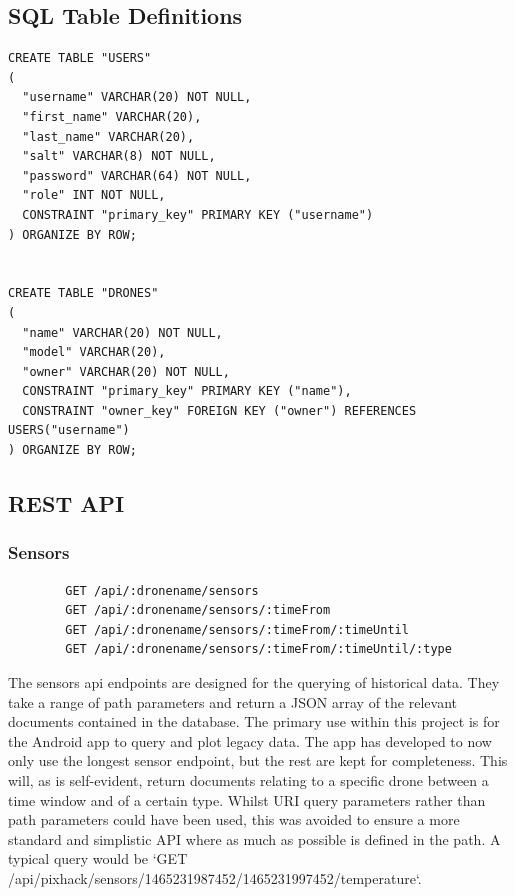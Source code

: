 \documentclass{article}
\begin{document}
\subsection{SQL Table Definitions} \label{SQLDefinitions}
\begin{center}
\begin{lstlisting} 
CREATE TABLE "USERS"
(
  "username" VARCHAR(20) NOT NULL,
  "first_name" VARCHAR(20),
  "last_name" VARCHAR(20),
  "salt" VARCHAR(8) NOT NULL,
  "password" VARCHAR(64) NOT NULL,
  "role" INT NOT NULL,
  CONSTRAINT "primary_key" PRIMARY KEY ("username")
) ORGANIZE BY ROW;


CREATE TABLE "DRONES"
(
  "name" VARCHAR(20) NOT NULL,
  "model" VARCHAR(20),
  "owner" VARCHAR(20) NOT NULL,
  CONSTRAINT "primary_key" PRIMARY KEY ("name"),
  CONSTRAINT "owner_key" FOREIGN KEY ("owner") REFERENCES USERS("username")
) ORGANIZE BY ROW;
\end{lstlisting}
\end{center}

\subsection{REST API} \label{apdxRestApi}
\subsubsection{Sensors}
\begin{center}
	\begin{lstlisting}
		GET /api/:dronename/sensors
		GET /api/:dronename/sensors/:timeFrom
		GET /api/:dronename/sensors/:timeFrom/:timeUntil
		GET /api/:dronename/sensors/:timeFrom/:timeUntil/:type
	\end{lstlisting}
\end{center}
The sensors api endpoints are designed for the querying of historical data. They take a range of path parameters and return a JSON array of the relevant documents contained in the database. The primary use within this project is for the Android app to query and plot legacy data. The app has developed to now only use the longest sensor endpoint, but the rest are kept for completeness. This will, as is self-evident, return documents relating to a specific drone between a time window and of a certain type. Whilst URI query parameters rather than path parameters could have been used, this was avoided to ensure a more standard and simplistic API where as much as possible is defined in the path. A typical query would be `GET /api/pixhack/sensors/1465231987452/1465231997452/temperature`.
\end{document}
